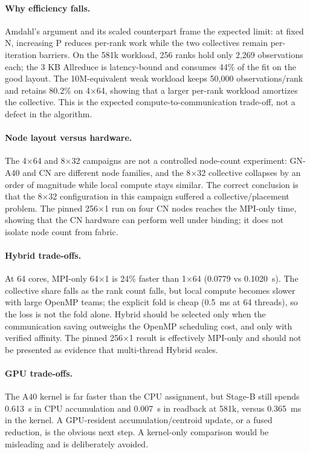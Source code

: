\documentclass[10pt,a4paper]{article}
\begin{document}
\paragraph{Why efficiency falls.}
Amdahl's argument \citep{amdahl1967} and its scaled counterpart \citep{gustafson1988} frame the expected limit: at fixed N, increasing P reduces per-rank work while the two collectives remain
per-iteration barriers. On the 581k workload, 256 ranks hold only 2,269
observations each; the 3 KB Allreduce is latency-bound and consumes 44\% of
the fit on the good layout. The 10M-equivalent weak workload keeps 50,000
observations/rank and retains 80.2\% on 4$\times$64, showing that a larger
per-rank workload amortizes the collective. This is the expected
compute-to-communication trade-off, not a defect in the algorithm.

\paragraph{Node layout versus hardware.}
The 4$\times$64 and 8$\times$32 campaigns are not a controlled node-count
experiment: GN-A40 and CN are different node families, and the 8$\times$32
collective collapses by an order of magnitude while local compute stays
similar. The correct conclusion is that the 8$\times$32 configuration in this
campaign suffered a collective/placement problem. The pinned 256$\times$1 run
on four CN nodes reaches the MPI-only time, showing that the CN hardware can
perform well under binding; it does not isolate node count from fabric.

\paragraph{Hybrid trade-offs.}
At 64 cores, MPI-only 64$\times$1 is 24\% faster than 1$\times$64 (0.0779 vs
0.1020~s). The collective share falls as the rank count falls, but local
compute becomes slower with large OpenMP teams; the explicit fold is cheap
(0.5~ms at 64 threads), so the loss is not the fold alone. Hybrid should be
selected only when the communication saving outweighs the OpenMP scheduling
cost, and only with verified affinity. The pinned 256$\times$1 result is
effectively MPI-only and should not be presented as evidence that multi-thread
Hybrid scales.

\paragraph{GPU trade-offs.}
The A40 kernel is far faster than the CPU assignment, but Stage-B still spends
0.613~s in CPU accumulation and 0.007~s in readback at 581k, versus 0.365~ms
in the kernel. A GPU-resident accumulation/centroid update, or a fused
reduction, is the obvious next step. A kernel-only comparison would be
misleading and is deliberately avoided.
\end{document}
